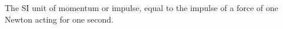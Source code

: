  The SI unit of momentum or impulse, equal to the impulse
of a force of one Newton acting for one second.
